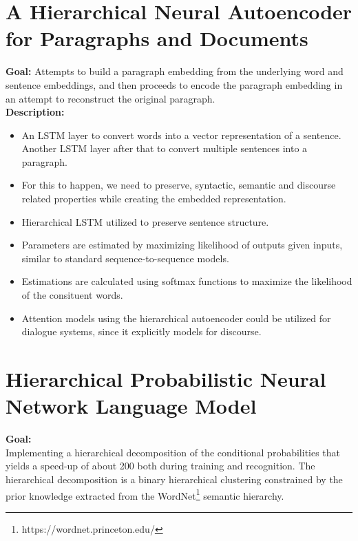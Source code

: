 \documentclass[11pt,a4paper]{article}
\begin{document}


\section{A Hierarchical Neural Autoencoder for Paragraphs and Documents} %
\label{sec:a_hierarchical_neural_autoencoder_for_paragraphs_and_documents}

  \textbf{Goal:}
  Attempts to build a paragraph embedding from the underlying word and sentence embeddings, and then proceeds to encode the paragraph embedding in an attempt to reconstruct the original paragraph.\\

  \textbf{Description:}
  \begin{itemize}
    \item
    An LSTM layer to convert words into a vector representation of a sentence. Another LSTM layer after that to convert multiple sentences into a paragraph.
    \item
    For this to happen, we need to preserve, syntactic, semantic and discourse related properties while creating the embedded representation.
    \item
    Hierarchical LSTM utilized to preserve sentence structure.
    \item
    Parameters are estimated by maximizing likelihood of outputs given inputs, similar to standard sequence-to-sequence models.
    \item
    Estimations are calculated using softmax functions to maximize the likelihood of the consituent words.
    \item
    Attention models using the hierarchical autoencoder could be utilized for dialogue systems, since it explicitly models for discourse.
  \end{itemize}



\section{Hierarchical Probabilistic Neural Network Language Model} %
\label{sec:hierarchical_probabilistic_neural_network_language_model}

  \textbf{Goal:}\\
  Implementing a  hierarchical decomposition of the conditional probabilities that yields a speed-up of about 200 both during training and recognition. The hierarchical decomposition is a binary hierarchical clustering constrained by the prior knowledge extracted from the WordNet\footnote{https://wordnet.princeton.edu/} semantic hierarchy.\\
\end{document}
